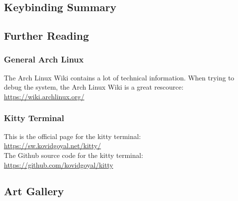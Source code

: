 \documentclass[a4paper, 12pt]{report}
\begin{document}
\begin{center}
\subsection{Keybinding Summary}
\begin{comment}
\end{comment}

\subsection{Further Reading}
\begin{comment}
\end{comment}
\subsubsection{General Arch Linux}
\begin{comment}
\end{comment}
The Arch Linux Wiki contains a lot of technical information. When trying to debug the system, the Arch Linux Wiki is a great rescource:
\\\url{https://wiki.archlinux.org/} 
\subsubsection{Kitty Terminal}
\begin{comment}
\end{comment}
This is the official page for the kitty terminal:
\\\url{https://sw.kovidgoyal.net/kitty/} 
\\The Github source code for the kitty terminal:
\\\url{https://github.com/kovidgoyal/kitty} 


\subsection{Art Gallery}
\begin{comment}
Fill with Unixporn posts
\end{comment}














































\end{center}
\end{document}
